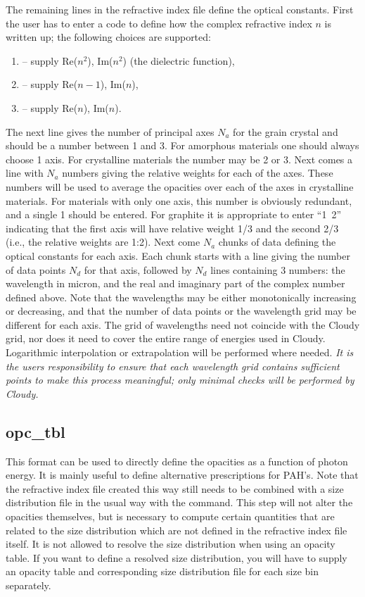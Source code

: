 The remaining lines in the refractive index file define the optical constants.
First the user has to enter a code to define how the complex refractive index
$n$ is written up; the following choices are supported:
\begin{enumerate}
\item
-- supply Re($n^2$), Im($n^2$) (the dielectric function),
\item
-- supply Re($n-1$), Im($n$),
\item
-- supply Re($n$), Im($n$).
\end{enumerate}
The next line gives the number of principal axes $N_a$ for the grain crystal
and should be a number between 1 and 3. For amorphous materials one should
always choose 1 axis. For crystalline materials the number may be 2 or 3. Next
comes a line with $N_a$ numbers giving the relative weights for each of the
axes. These numbers will be used to average the opacities over each of the
axes in crystalline materials. For materials with only one axis, this number
is obviously redundant, and a single 1 should be entered. For graphite it is
appropriate to enter ``1~2'' indicating that the first axis will have relative
weight 1/3 and the second 2/3 (i.e., the relative weights are 1:2). Next come
$N_a$ chunks of data defining the optical constants for each axis. Each chunk
starts with a line giving the number of data points $N_d$ for that axis,
followed by $N_d$ lines containing 3 numbers: the wavelength in micron, and
the real and imaginary part of the complex number defined above. Note that the
wavelengths may be either monotonically increasing or decreasing, and that the
number of data points or the wavelength grid may be different for each axis.
The grid of wavelengths need not coincide with the Cloudy grid, nor does it
need to cover the entire range of energies used in Cloudy. Logarithmic
interpolation or extrapolation will be performed where needed. {\em It is the
users responsibility to ensure that each wavelength grid contains sufficient
points to make this process meaningful; only minimal checks will be performed
by Cloudy. }


\subsection{opc\_tbl}

This format can be used to directly define the opacities as a function of
photon energy. It is mainly useful to define alternative prescriptions for
PAH's. Note that the refractive index file created this way still needs to be
combined with a size distribution file in the usual way with the
 command. This step will not alter the opacities
themselves, but is necessary to compute certain quantities that are related to
the size distribution which are not defined in the refractive index file
itself. It is not allowed to resolve the size distribution when using an
opacity table. If you want to define a resolved size distribution, you will
have to supply an opacity table and corresponding size distribution file for
each size bin separately.

